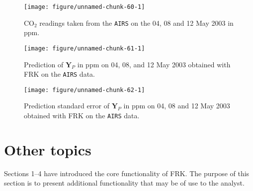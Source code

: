 \documentclass{article}\usepackage[]{graphicx}\usepackage[]{color}
\newenvironment{knitrout}{}{} %
\renewcommand{\tt} {\texttt}
\newcommand{\pkg}[1]{{\fontseries{b}\selectfont #1}}
\newcommand{\Yvec}{\mathbf{Y}}
\begin{document}
\begin{knitrout}
\color{fgcolor}\begin{figure}[t!]

{\centering \texttt{[image: figure/unnamed-chunk-60-1]} 

}

\caption{CO$_2$ readings taken from the \tt{AIRS} on the 04, 08 and 12 May 2003 in ppm. \label{fig:FRK_AIRS_ST1}}\label{fig:unnamed-chunk-60}
\end{figure}


\end{knitrout}

\begin{knitrout}
\color{fgcolor}\begin{figure}[t!]

{\centering \texttt{[image: figure/unnamed-chunk-61-1]} 

}

\caption{Prediction of $\Yvec_P$ in ppm on 04, 08, and 12 May 2003 obtained with \pkg{FRK} on the \tt{AIRS} data. \label{fig:FRK_AIRS_ST2}}\label{fig:unnamed-chunk-61}
\end{figure}


\end{knitrout}

\begin{knitrout}
\color{fgcolor}\begin{figure}[t!]

{\centering \texttt{[image: figure/unnamed-chunk-62-1]} 

}

\caption{Prediction standard error of $\Yvec_P$ in ppm on 04, 08 and 12 May 2003 obtained with \pkg{FRK} on the \tt{AIRS} data. \label{fig:FRK_AIRS_ST3}}\label{fig:unnamed-chunk-62}
\end{figure}


\end{knitrout}




\section{Other topics}\label{sec:other}

Sections 1--4 have introduced the core functionality of \pkg{FRK}. The purpose of this section is to present additional functionality that may be of use to the analyst.
\end{document}

